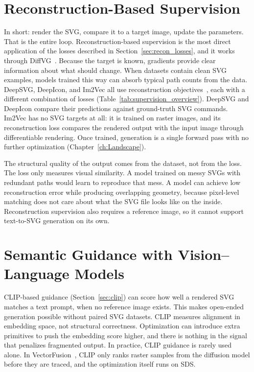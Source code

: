 \section{Reconstruction-Based Supervision}
\label{sec:recon_supervision}

In short: render the SVG, compare it to a target image, update the parameters. 
That is the entire loop. Reconstruction-based supervision is the most 
direct application of the losses described in Section~\ref{sec:recon_losses}, 
and it works through DiffVG~\cite{liDifferentiableVectorGraphics2020a}.
Because the target is known, gradients provide clear information about what should change. 
When datasets contain clean SVG examples, models trained this way can absorb typical path 
counts from the data. DeepSVG, DeepIcon, and Im2Vec all use reconstruction 
objectives~\cite{carlierDeepSVGHierarchicalGenerative2020, bingDeepIconHierarchicalNetwork2024, reddyIm2VecSynthesizingVector2021}, 
each with a different combination of losses (Table~\ref{tab:supervision_overview}). 
DeepSVG and DeepIcon compare their predictions against ground-truth SVG commands. 
Im2Vec has no SVG targets at all: it is trained on raster images, and its reconstruction loss 
compares the rendered output with the input image through differentiable rendering. 
Once trained, generation is a single forward pass with no further optimization (Chapter~\ref{ch:Landscape}).

The structural quality of the output comes from the dataset, not from the loss. 
The loss only measures visual similarity. A model trained on messy SVGs with redundant 
paths would learn to reproduce that mess. A model can achieve low 
reconstruction error while producing overlapping geometry, 
because pixel-level matching does not care about what the SVG file looks like on the inside. 
Reconstruction supervision also requires a reference image, so it cannot support text-to-SVG generation on its own.


\section{Semantic Guidance with Vision--Language Models}
\label{sec:clip_guidance}

CLIP-based guidance (Section~\ref{sec:clip}) can score how well a rendered SVG matches a text prompt, when no reference image exists. 
This makes open-ended generation possible without paired SVG datasets.
CLIP measures alignment in embedding space, not structural correctness. 
Optimization can introduce extra primitives to push the embedding score higher, 
and there is nothing in the signal that penalizes fragmented output. 
In practice, CLIP guidance is rarely used alone. In VectorFusion~\cite{jainVectorFusionTexttoSVGAbstracting2022}, 
CLIP only ranks raster samples from the diffusion model before they are traced, 
and the optimization itself runs on SDS.



